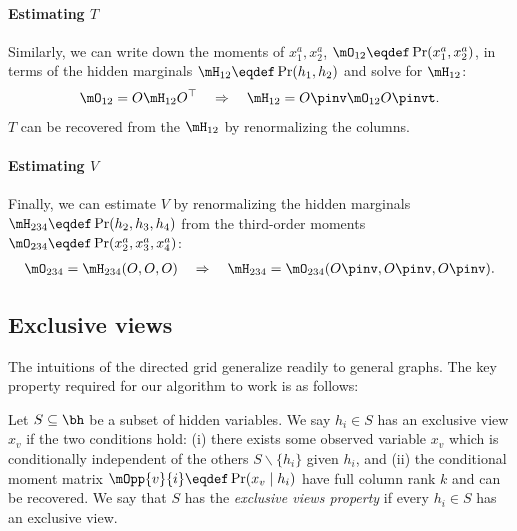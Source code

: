 \paragraph{Estimating $T$}
Similarly, we can write down the moments of $x^a_1, x^a_2$, $\mO_{12}
  \eqdef \Pr(x^a_1, x^a_2)$, in terms of the hidden marginals $\mH_{12}
  \eqdef \Pr(h_1, h_2)$ and solve for $\mH_{12}$:
\begin{align*}
\mO_{12} = O \mH_{12} O^\top \quad\Rightarrow\quad
  \mH_{12} = O\pinv  \mO_{12} O\pinvt .
\end{align*}
$T$ can be recovered from the $\mH_{12}$ by renormalizing the columns.

\paragraph{Estimating $V$}
Finally, we can estimate $V$ by renormalizing the hidden marginals
$\mH_{234} \eqdef \Pr(h_2, h_3, h_4)$ from the third-order moments
$\mO_{234} \eqdef \Pr(x^a_2, x^a_3, x^a_4)$:
\begin{align*}
  \mO_{234} = \mH_{234}(O, O, O) \quad\Rightarrow\quad
  \mH_{234} = \mO_{234}(O\pinv , O\pinv , O\pinv ).
\end{align*}

\subsection{Exclusive views}
\label{sec:general}


The intuitions of the directed grid generalize readily to general graphs.
The key property required for our algorithm to work is as follows:
\begin{definition}
  \label{def:exclusive-views}
Let $S \subseteq \bh$ be a subset of hidden variables.
We say $h_i \in S$ has an exclusive view $x_v$
  if the two conditions hold:
  (i) there exists some observed variable
  $x_{v}$ which is conditionally independent of the others $S \backslash \{ h_i \}$ given $h_i$,
  and (ii) the conditional moment matrix $\mOpp{v}{i} \eqdef
  \Pr(x_{v} \mid h_i)$ have full column rank $k$ and can be recovered.
We say that $S$ has the \emph{exclusive views property} if every $h_i \in S$ has an exclusive view.
\end{definition}

